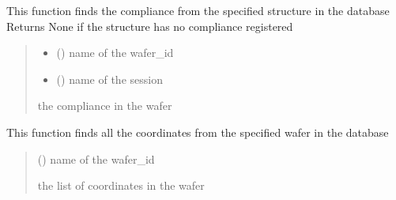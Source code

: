 \documentclass[letterpaper,10pt,english]{sphinxmanual}
\begin{document}

\begin{fulllineitems}
\label{\detokenize{getter:getter.get_compliance}}
\pysigstartsignatures
{}
\pysigstopsignatures
\sphinxAtStartPar
This function finds the compliance from the specified structure in the database
Returns None if the structure has no compliance registered
\begin{quote}\begin{description}
\begin{itemize}
\item {} 
\sphinxAtStartPar
{} () \textendash{} name of the wafer\_id

\item {} 
\sphinxAtStartPar
{} () \textendash{} name of the session

\end{itemize}

\sphinxAtStartPar
the compliance in the wafer

\end{description}\end{quote}

\end{fulllineitems}


\begin{fulllineitems}
\label{\detokenize{getter:getter.get_coords}}
\pysigstartsignatures
{}
\pysigstopsignatures
\sphinxAtStartPar
This function finds all the coordinates from the specified wafer in the database
\begin{quote}\begin{description}
\sphinxAtStartPar
{} () \textendash{} name of the wafer\_id

\sphinxAtStartPar
the list of coordinates in the wafer

\end{description}\end{quote}

\end{fulllineitems}
\end{document}
